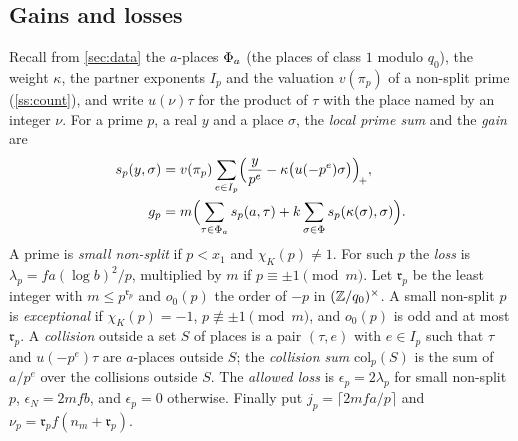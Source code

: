 \subsection{Gains and losses}\label{ss:gains}
Recall from \cref{sec:data} the $a$-places $\Phi_a$ (the places of class $1$ modulo $q_0$), the weight $\kappa$, the
partner exponents $I_p$ and the valuation $v(\pi_p)$ of a non-split prime (\cref{ss:count}), and write $u(\nu)\tau$
for the product of $\tau$ with the place named by an integer $\nu$. For a prime $p$, a real $y$ and a place $\sigma$, the
\emph{local prime sum} and the \emph{gain} are
\begin{align*}
  s_p(y,\sigma)&=v(\pi_p)\sum_{e\in I_p}\Bigl(\frac y{p^e}-\kappa\bigl(u(-p^e)\sigma\bigr)\Bigr)_{\!+},\\
  g_p&=m\Bigl(\sum_{\tau\in\Phi_a}s_p(a,\tau)+k\sum_{\sigma\in\Phi}s_p(\kappa(\sigma),\sigma)\Bigr).
\end{align*}
A prime is \emph{small non-split} if $p<x_1$ and $\chi_K(p)\ne1$. For such $p$ the \emph{loss} is
$\lambda_p=fa(\log b)^2/p$, multiplied by $m$ if $p\equiv\pm1\pmod m$. Let $\mathfrak r_p$ be the least integer with
$m\le p^{\mathfrak r_p}$ and $o_0(p)$ the order of $-p$ in $(\mathbb{Z}/q_0)^\times$. A small non-split $p$ is \emph{exceptional} if
$\chi_K(p)=-1$, $p\not\equiv\pm1\pmod m$, and $o_0(p)$ is odd and at most $\mathfrak r_p$. A \emph{collision} outside a set $S$ of
places is a pair $(\tau,e)$ with $e\in I_p$ such that $\tau$ and $u(-p^e)\tau$ are $a$-places outside $S$; the \emph{collision
sum} $\mathrm{col}_p(S)$ is the sum of $a/p^e$ over the collisions outside $S$. The \emph{allowed loss} is
$\epsilon_p=2\lambda_p$ for small non-split $p$, $\epsilon_N=2mfb$, and $\epsilon_p=0$ otherwise. Finally put
$j_p=\lceil2mfa/p\rceil$ and $\nu_p=\mathfrak r_pf(n_m+\mathfrak r_p)$.

